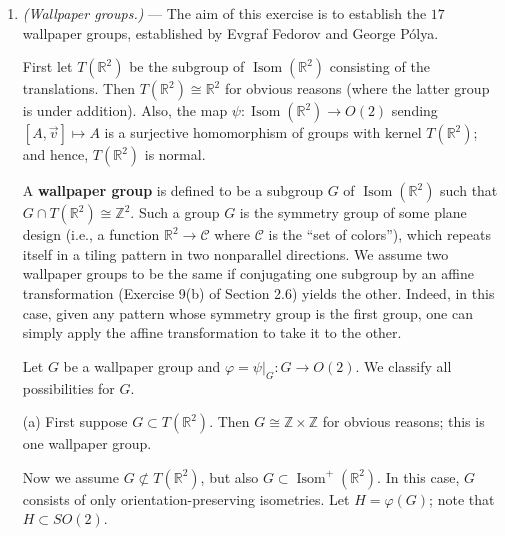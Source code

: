 \documentclass[leqno]{book}
\begin{document}
\begin{enumerate}
(b) List the answers to part (a) for $n=1,2,\dots,7$.  Then (using number theory), show that for any $n\in\mathbb Z$ whatsoever, the expression obtained in part (a) is an integer.  (We know it is an integer by another method\----it comes from counting.)

(c) Now suppose there are $n$ available colors.  Each face of a regular icosahedron is to be colored with one of these colorings.  Two colorings are considered to be the same if (and only if) one can be obtained from the other through rotating the icosahedron.  How many different ways are there to color the faces?

\item\emph{(Wallpaper groups.)} \---- The aim of this exercise is to establish the $17$ wallpaper groups, established by Evgraf Fedorov and George P\'olya.

First let $T(\mathbb R^2)$ be the subgroup of $\operatorname{Isom}(\mathbb R^2)$ consisting of the translations.  Then $T(\mathbb R^2)\cong\mathbb R^2$ for obvious reasons (where the latter group is under addition).  Also, the map $\psi:\operatorname{Isom}(\mathbb R^2)\to O(2)$ sending $[A,\vec v]\mapsto A$ is a surjective homomorphism of groups with kernel $T(\mathbb R^2)$; and hence, $T(\mathbb R^2)$ is normal.

A \textbf{wallpaper group} is defined to be a subgroup $G$ of $\operatorname{Isom}(\mathbb R^2)$ such that $G\cap T(\mathbb R^2)\cong\mathbb Z^2$.  Such a group $G$ is the symmetry group of some plane design (i.e., a function $\mathbb R^2\to\mathcal C$ where $\mathcal C$ is the ``set of colors''), which repeats itself in a tiling pattern in two nonparallel directions.  We assume two wallpaper groups to be the same if conjugating one subgroup by an affine transformation (Exercise 9(b) of Section 2.6) yields the other.  Indeed, in this case, given any pattern whose symmetry group is the first group, one can simply apply the affine transformation to take it to the other. %

Let $G$ be a wallpaper group and $\varphi=\psi|_G:G\to O(2)$.  We classify all possibilities for $G$.

(a) First suppose $G\subset T(\mathbb R^2)$.  Then $G\cong\mathbb Z\times\mathbb Z$ for obvious reasons; this is one wallpaper group.

Now we assume $G\not\subset T(\mathbb R^2)$, but also $G\subset\operatorname{Isom}^+(\mathbb R^2)$.  In this case, $G$ consists of only orientation-preserving isometries.  Let $H=\varphi(G)$; note that $H\subset SO(2)$.


\end{enumerate}
\end{document}
